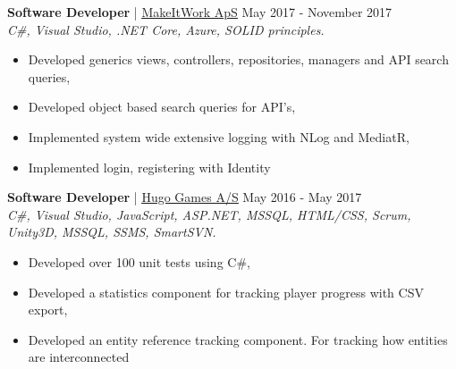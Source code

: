 \documentclass[margin, 10pt, hidelinks]{res} %
\newcommand{\emphasize}{\large\bfseries} %
\begin{document}
\begin{resume}
{\emphasize Software Developer} | \href{http://www.makeitwork.dk}{\underline{MakeItWork ApS}}  \hfill May 2017 - November 2017  \\
{\it C\#, Visual Studio, .NET Core, Azure, SOLID principles. } %
\begin{itemize} \setlength{\itemindent}{-0.1in}\itemsep 0pt %
\item Developed generics views, controllers, repositories, managers and API search queries,
\item Developed object based search queries for API's,
\item Implemented system wide extensive logging with NLog and MediatR,
\item Implemented login, registering with Identity
\end{itemize}

{\emphasize Software Developer} | \href{https://www.hugogames.com}{\underline{Hugo Games A/S}}   \hfill May 2016 - May 2017  \\
{\it C\#, Visual Studio, JavaScript, ASP.NET, MSSQL, HTML/CSS, Scrum, Unity3D, MSSQL, SSMS, SmartSVN.} %
\begin{itemize} \setlength{\itemindent}{-0.1in}\itemsep 0pt %
\item Developed over 100 unit tests using C\#,
\item Developed a statistics component for tracking player progress with CSV export,
\item Developed an entity reference tracking component. For tracking how entities are interconnected
\end{itemize}




\end{resume}
\end{document}

